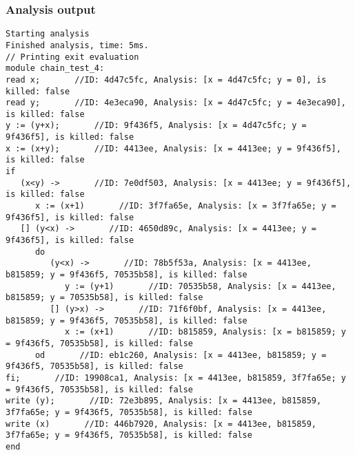 \subsubsection{Analysis output}
\begin{lstlisting}
Starting analysis
Finished analysis, time: 5ms.
// Printing exit evaluation
module chain_test_4:
read x;       //ID: 4d47c5fc, Analysis: [x = 4d47c5fc; y = 0], is killed: false
read y;       //ID: 4e3eca90, Analysis: [x = 4d47c5fc; y = 4e3eca90], is killed: false
y := (y+x);       //ID: 9f436f5, Analysis: [x = 4d47c5fc; y = 9f436f5], is killed: false
x := (x+y);       //ID: 4413ee, Analysis: [x = 4413ee; y = 9f436f5], is killed: false
if
   (x<y) ->       //ID: 7e0df503, Analysis: [x = 4413ee; y = 9f436f5], is killed: false
      x := (x+1)       //ID: 3f7fa65e, Analysis: [x = 3f7fa65e; y = 9f436f5], is killed: false
   [] (y<x) ->       //ID: 4650d89c, Analysis: [x = 4413ee; y = 9f436f5], is killed: false
      do
         (y<x) ->       //ID: 78b5f53a, Analysis: [x = 4413ee, b815859; y = 9f436f5, 70535b58], is killed: false
            y := (y+1)       //ID: 70535b58, Analysis: [x = 4413ee, b815859; y = 70535b58], is killed: false
         [] (y>x) ->       //ID: 71f6f0bf, Analysis: [x = 4413ee, b815859; y = 9f436f5, 70535b58], is killed: false
            x := (x+1)       //ID: b815859, Analysis: [x = b815859; y = 9f436f5, 70535b58], is killed: false
      od       //ID: eb1c260, Analysis: [x = 4413ee, b815859; y = 9f436f5, 70535b58], is killed: false
fi;       //ID: 19908ca1, Analysis: [x = 4413ee, b815859, 3f7fa65e; y = 9f436f5, 70535b58], is killed: false
write (y);       //ID: 72e3b895, Analysis: [x = 4413ee, b815859, 3f7fa65e; y = 9f436f5, 70535b58], is killed: false
write (x)       //ID: 446b7920, Analysis: [x = 4413ee, b815859, 3f7fa65e; y = 9f436f5, 70535b58], is killed: false
end
\end{lstlisting}
